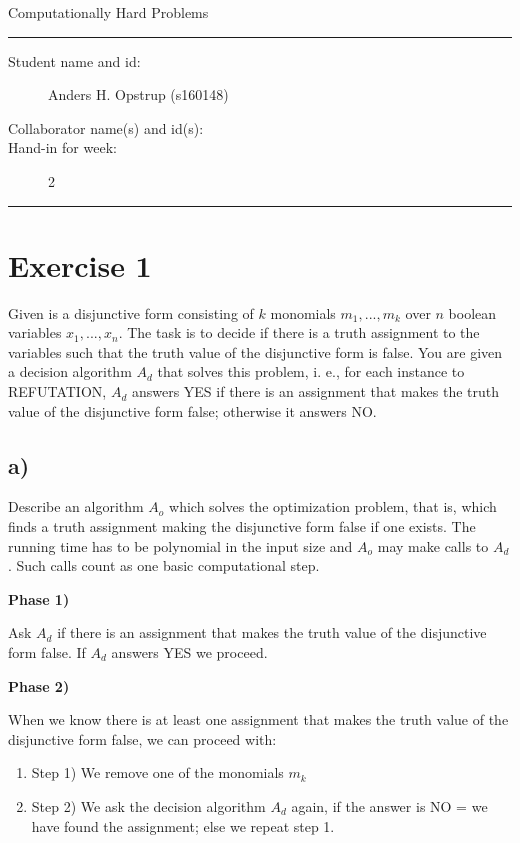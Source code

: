 \documentclass[11pt]{article}
\begin{document}
\begin{center}
{{\Large \sc Computationally Hard Problems}}
\end{center}
\rule{\textwidth}{1pt}
\begin{description}
\item[Student name and id:] Anders H. Opstrup (s160148)
\item[Collaborator name(s) and id(s):]
\item[Hand-in for week:] 2
\end{description}
\rule{\textwidth}{1pt}

\section*{Exercise 1}
Given is a disjunctive form consisting of $k$ monomials $m_{1}, . . . , m_{k}$ over $n$ boolean variables $x_{1}, . . . , x_{n}$. The task is to decide if there is a truth assignment to the variables such that the truth value of the disjunctive form is false.
\newline \newline
You are given a decision algorithm $A_{d}$ that solves this problem, i. e., for each instance to REFUTATION, $A_{d}$ answers YES if there is an assignment that makes the truth value of the disjunctive form false; otherwise it answers NO.

\subsection*{a)}
Describe an algorithm $A_{o}$ which solves the optimization problem, that is, which finds a truth assignment making the disjunctive form false if one exists. The running time has to be polynomial in the input size and $A_{o}$ may make calls to $A_{d}$. Such calls count as one basic computational step. \newline

\textbf{Phase 1)} \newline

Ask $A_{d}$ if there is an assignment that makes the truth value of the disjunctive form false. If $A_{d}$ answers YES we proceed. \newline

\textbf{Phase 2)} \newline

When we know there is at least one assignment that makes the truth value of the disjunctive form false, we can proceed with:
\begin{enumerate}
	\item Step 1) We remove one of the monomials $m_{k}$
	\item Step 2) We ask the decision algorithm $A_{d}$ again, if the answer is NO = we have found the assignment; else we repeat step 1.
\end{enumerate}
\end{document}
